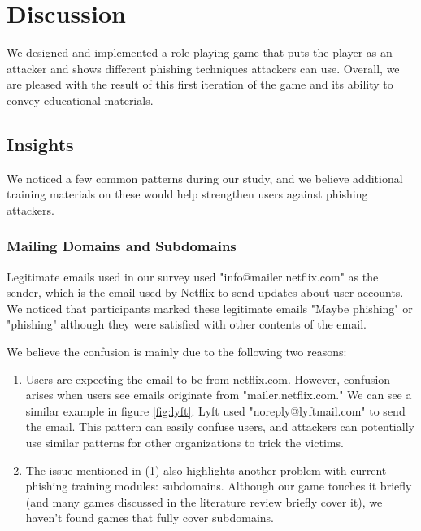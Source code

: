 



\chapter{Discussion}
We designed and implemented a role-playing game that puts the player as an attacker and shows different phishing techniques attackers can use.  Overall, we are pleased with the result of this first iteration of the game and its ability to convey educational materials.

\section{Insights}
We noticed a few common patterns during our study, and we believe additional training materials on these would help strengthen users against phishing attackers.

\subsection{Mailing Domains and Subdomains}
Legitimate emails used in our survey used "info@mailer.netflix.com" as the sender, which is the email used by Netflix to send updates about user accounts. We noticed that participants marked these legitimate emails "Maybe phishing" or "phishing" although they were satisfied with other contents of the email.

We believe the confusion is mainly due to the following two reasons:

\begin{enumerate}
    \item Users are expecting the email to be from netflix.com. However, confusion arises when users see emails originate from "mailer.netflix.com." We can see a similar example in figure \ref{fig:lyft}. Lyft used "noreply@lyftmail.com" to send the email. This pattern can easily confuse users, and attackers can potentially use similar patterns for other organizations to trick the victims.

    \item The issue mentioned in (1) also highlights another problem with current phishing training modules: subdomains. Although our game touches it briefly (and many games discussed in the literature review briefly cover it), we haven't found games that fully cover subdomains.
\end{enumerate}

